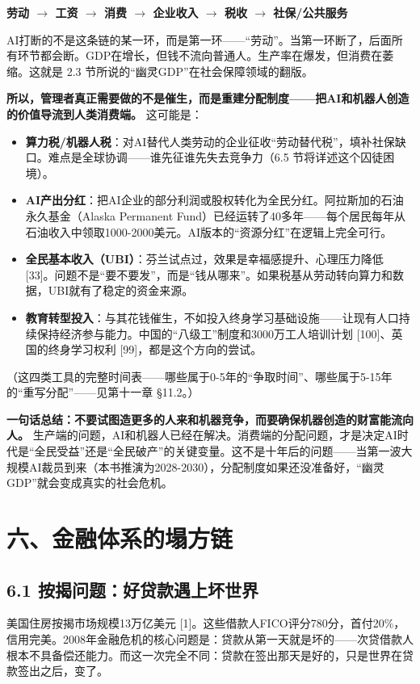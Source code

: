 \documentclass[11pt,a4paper]{ctexart}
\begin{document}
\textbf{劳动 $\to$ 工资 $\to$ 消费 $\to$ 企业收入 $\to$ 税收 $\to$ 社保/公共服务}

AI打断的不是这条链的某一环，而是第一环——“劳动”。当第一环断了，后面所有环节都会断。GDP在增长，但钱不流向普通人。生产率在爆发，但消费在萎缩。这就是 2.3 节所说的“幽灵GDP”在社会保障领域的翻版。

\textbf{所以，管理者真正需要做的不是催生，而是重建分配制度——把AI和机器人创造的价值导流到人类消费端。} 这可能是：

\begin{itemize}
  \item \textbf{算力税/机器人税}：对AI替代人类劳动的企业征收“劳动替代税”，填补社保缺口。难点是全球协调——谁先征谁先失去竞争力（6.5 节将详述这个囚徒困境）。
  \item \textbf{AI产出分红}：把AI企业的部分利润或股权转化为全民分红。阿拉斯加的石油永久基金（Alaska Permanent Fund）已经运转了40多年——每个居民每年从石油收入中领取1000-2000美元。AI版本的“资源分红”在逻辑上完全可行。
  \item \textbf{全民基本收入（UBI）}：芬兰试点过，效果是幸福感提升、心理压力降低 [33]。问题不是“要不要发”，而是“钱从哪来”。如果税基从劳动转向算力和数据，UBI就有了稳定的资金来源。
  \item \textbf{教育转型投入}：与其花钱催生，不如投入终身学习基础设施——让现有人口持续保持经济参与能力。中国的“八级工”制度和3000万工人培训计划 [100]、英国的终身学习权利 [99]，都是这个方向的尝试。
\end{itemize}

（这四类工具的完整时间表——哪些属于0-5年的“争取时间”、哪些属于5-15年的“重写分配”——见第十一章 \S{}11.2。）

\textbf{一句话总结：不要试图造更多的人来和机器竞争，而要确保机器创造的财富能流向人。} 生产端的问题，AI和机器人已经在解决。消费端的分配问题，才是决定AI时代是“全民受益”还是“全民破产”的关键变量。这不是十年后的问题——当第一波大规模AI裁员到来（本书推演为2028-2030），分配制度如果还没准备好，“幽灵GDP”就会变成真实的社会危机。

\section{六、金融体系的塌方链}

\subsection{6.1 按揭问题：好贷款遇上坏世界}

美国住房按揭市场规模13万亿美元 [1]。这些借款人FICO评分780分，首付20\%，信用完美。2008年金融危机的核心问题是：贷款从第一天就是坏的——次贷借款人根本不具备偿还能力。而这一次完全不同：贷款在签出那天是好的，只是世界在贷款签出之后，变了。
\end{document}
